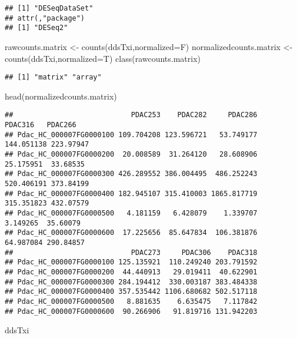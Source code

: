 \documentclass[
]{article}
\newenvironment{Shaded}{\begin{snugshade}}{\end{snugshade}}
\newcommand{\AttributeTok}[1]{\textcolor[rgb]{0.77,0.63,0.00}{#1}}
\newcommand{\FunctionTok}[1]{\textcolor[rgb]{0.00,0.00,0.00}{#1}}
\newcommand{\NormalTok}[1]{#1}
\newcommand{\OtherTok}[1]{\textcolor[rgb]{0.56,0.35,0.01}{#1}}
\begin{document}
\begin{verbatim}
## [1] "DESeqDataSet"
## attr(,"package")
## [1] "DESeq2"
\end{verbatim}

\begin{Shaded}
\begin{Highlighting}[]
\NormalTok{rawcounts.matrix }\OtherTok{\textless{}{-}} \FunctionTok{counts}\NormalTok{(ddsTxi,}\AttributeTok{normalized=}\NormalTok{F)}
\NormalTok{normalizedcounts.matrix }\OtherTok{\textless{}{-}} \FunctionTok{counts}\NormalTok{(ddsTxi,}\AttributeTok{normalized=}\NormalTok{T)}
\FunctionTok{class}\NormalTok{(rawcounts.matrix)}
\end{Highlighting}
\end{Shaded}

\begin{verbatim}
## [1] "matrix" "array"
\end{verbatim}

\begin{Shaded}
\begin{Highlighting}[]
\FunctionTok{head}\NormalTok{(normalizedcounts.matrix)}
\end{Highlighting}
\end{Shaded}

\begin{verbatim}
##                            PDAC253    PDAC282     PDAC286    PDAC316   PDAC266
## Pdac_HC_000007FG0000100 109.704208 123.596721   53.749177 144.051138 223.97947
## Pdac_HC_000007FG0000200  20.008589  31.264120   28.608906  25.175951  33.68535
## Pdac_HC_000007FG0000300 426.289552 386.004495  486.252243 520.406191 373.84199
## Pdac_HC_000007FG0000400 182.945107 315.410003 1865.817719 315.351823 432.07579
## Pdac_HC_000007FG0000500   4.181159   6.428079    1.339707   3.149265  35.60079
## Pdac_HC_000007FG0000600  17.225656  85.647834  106.381876  64.987084 290.84857
##                            PDAC273     PDAC306    PDAC318
## Pdac_HC_000007FG0000100 125.135921  110.249240 203.791592
## Pdac_HC_000007FG0000200  44.440913   29.019411  40.622901
## Pdac_HC_000007FG0000300 284.194412  330.003187 383.484338
## Pdac_HC_000007FG0000400 357.535442 1106.680682 502.517118
## Pdac_HC_000007FG0000500   8.881635    6.635475   7.117842
## Pdac_HC_000007FG0000600  90.266906   91.819716 131.942203
\end{verbatim}

\begin{Shaded}
\begin{Highlighting}[]
\NormalTok{ddsTxi}
\end{Highlighting}
\end{Shaded}
\end{document}
